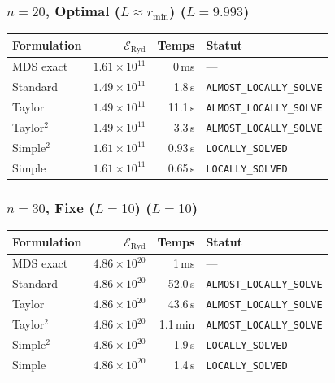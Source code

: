 \subsubsection{$n=20$, Optimal ($L{\approx}r_{\min}$) ($L=9.993$)}
\begin{longtable}{@{}lrrl@{}}
  \toprule
  Formulation & $\mathcal{E}_{\mathrm{Ryd}}$ & Temps & Statut \\
  \midrule
  \endhead
  MDS exact & $1.61\times10^{11}$ & 0\,ms & --- \\
  Standard & $1.49\times10^{11}$ & 1.8\,s & \texttt{ALMOST\_LOCALLY\_SOLVE} \\
  Taylor & $1.49\times10^{11}$ & 11.1\,s & \texttt{ALMOST\_LOCALLY\_SOLVE} \\
  Taylor$^2$ & $1.49\times10^{11}$ & 3.3\,s & \texttt{ALMOST\_LOCALLY\_SOLVE} \\
  Simple$^2$ & $1.61\times10^{11}$ & 0.93\,s & \texttt{LOCALLY\_SOLVED} \\
  Simple & $1.61\times10^{11}$ & 0.65\,s & \texttt{LOCALLY\_SOLVED} \\
  \bottomrule
\end{longtable}

\subsubsection{$n=30$, Fixe ($L{=}10$) ($L=10$)}
\begin{longtable}{@{}lrrl@{}}
  \toprule
  Formulation & $\mathcal{E}_{\mathrm{Ryd}}$ & Temps & Statut \\
  \midrule
  \endhead
  MDS exact & $4.86\times10^{20}$ & 1\,ms & --- \\
  Standard & $4.86\times10^{20}$ & 52.0\,s & \texttt{ALMOST\_LOCALLY\_SOLVE} \\
  Taylor & $4.86\times10^{20}$ & 43.6\,s & \texttt{ALMOST\_LOCALLY\_SOLVE} \\
  Taylor$^2$ & $4.86\times10^{20}$ & 1.1\,min & \texttt{ALMOST\_LOCALLY\_SOLVE} \\
  Simple$^2$ & $4.86\times10^{20}$ & 1.9\,s & \texttt{LOCALLY\_SOLVED} \\
  Simple & $4.86\times10^{20}$ & 1.4\,s & \texttt{LOCALLY\_SOLVED} \\
  \bottomrule
\end{longtable}

